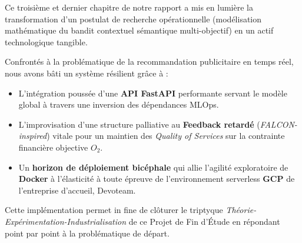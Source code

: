 Ce troisième et dernier chapitre de notre rapport a mis en lumière la transformation d'un postulat de recherche opérationnelle (modélisation mathématique du bandit contextuel sémantique multi-objectif) en un actif technologique tangible. 

Confrontés à la problématique de la recommandation publicitaire en temps réel, nous avons bâti un système résilient grâce à :
\begin{itemize}
    \item L'intégration poussée d'une \textbf{API FastAPI} performante servant le modèle global à travers une inversion des dépendances MLOps.
    \item L'improvisation d'une structure palliative au \textbf{Feedback retardé} (\textit{FALCON-inspired}) vitale pour un maintien des \textit{Quality of Services} sur la contrainte financière objective $O_2$.
    \item Un \textbf{horizon de déploiement bicéphale} qui allie l'agilité exploratoire de \textbf{Docker} à l'élasticité à toute épreuve de l'environnement serverless \textbf{GCP} de l'entreprise d'accueil, Devoteam.
\end{itemize}

Cette implémentation permet in fine de clôturer le triptyque \textit{Théorie-Expérimentation-Industrialisation} de ce Projet de Fin d'Étude en répondant point par point à la problématique de départ.

